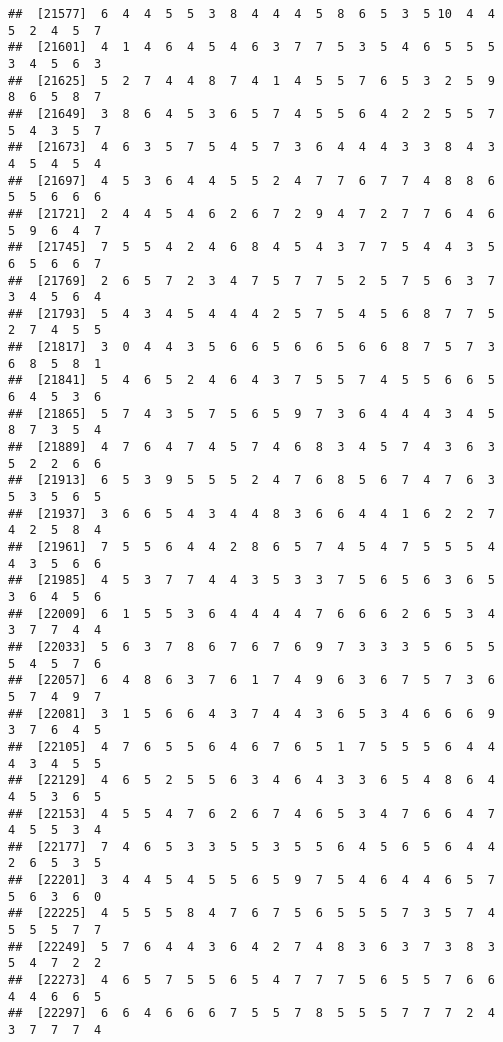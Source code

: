\documentclass[
]{book}
\begin{document}
\begin{verbatim}
##  [21577]  6  4  4  5  5  3  8  4  4  4  5  8  6  5  3  5 10  4  4  5  2  4  5  7
##  [21601]  4  1  4  6  4  5  4  6  3  7  7  5  3  5  4  6  5  5  5  3  4  5  6  3
##  [21625]  5  2  7  4  4  8  7  4  1  4  5  5  7  6  5  3  2  5  9  8  6  5  8  7
##  [21649]  3  8  6  4  5  3  6  5  7  4  5  5  6  4  2  2  5  5  7  5  4  3  5  7
##  [21673]  4  6  3  5  7  5  4  5  7  3  6  4  4  4  3  3  8  4  3  4  5  4  5  4
##  [21697]  4  5  3  6  4  4  5  5  2  4  7  7  6  7  7  4  8  8  6  5  5  6  6  6
##  [21721]  2  4  4  5  4  6  2  6  7  2  9  4  7  2  7  7  6  4  6  5  9  6  4  7
##  [21745]  7  5  5  4  2  4  6  8  4  5  4  3  7  7  5  4  4  3  5  6  5  6  6  7
##  [21769]  2  6  5  7  2  3  4  7  5  7  7  5  2  5  7  5  6  3  7  3  4  5  6  4
##  [21793]  5  4  3  4  5  4  4  4  2  5  7  5  4  5  6  8  7  7  5  2  7  4  5  5
##  [21817]  3  0  4  4  3  5  6  6  5  6  6  5  6  6  8  7  5  7  3  6  8  5  8  1
##  [21841]  5  4  6  5  2  4  6  4  3  7  5  5  7  4  5  5  6  6  5  6  4  5  3  6
##  [21865]  5  7  4  3  5  7  5  6  5  9  7  3  6  4  4  4  3  4  5  8  7  3  5  4
##  [21889]  4  7  6  4  7  4  5  7  4  6  8  3  4  5  7  4  3  6  3  5  2  2  6  6
##  [21913]  6  5  3  9  5  5  5  2  4  7  6  8  5  6  7  4  7  6  3  5  3  5  6  5
##  [21937]  3  6  6  5  4  3  4  4  8  3  6  6  4  4  1  6  2  2  7  4  2  5  8  4
##  [21961]  7  5  5  6  4  4  2  8  6  5  7  4  5  4  7  5  5  5  4  4  3  5  6  6
##  [21985]  4  5  3  7  7  4  4  3  5  3  3  7  5  6  5  6  3  6  5  3  6  4  5  6
##  [22009]  6  1  5  5  3  6  4  4  4  4  7  6  6  6  2  6  5  3  4  3  7  7  4  4
##  [22033]  5  6  3  7  8  6  7  6  7  6  9  7  3  3  3  5  6  5  5  5  4  5  7  6
##  [22057]  6  4  8  6  3  7  6  1  7  4  9  6  3  6  7  5  7  3  6  5  7  4  9  7
##  [22081]  3  1  5  6  6  4  3  7  4  4  3  6  5  3  4  6  6  6  9  3  7  6  4  5
##  [22105]  4  7  6  5  5  6  4  6  7  6  5  1  7  5  5  5  6  4  4  4  3  4  5  5
##  [22129]  4  6  5  2  5  5  6  3  4  6  4  3  3  6  5  4  8  6  4  4  5  3  6  5
##  [22153]  4  5  5  4  7  6  2  6  7  4  6  5  3  4  7  6  6  4  7  4  5  5  3  4
##  [22177]  7  4  6  5  3  3  5  5  3  5  5  6  4  5  6  5  6  4  4  2  6  5  3  5
##  [22201]  3  4  4  5  4  5  5  6  5  9  7  5  4  6  4  4  6  5  7  5  6  3  6  0
##  [22225]  4  5  5  5  8  4  7  6  7  5  6  5  5  5  7  3  5  7  4  5  5  5  7  7
##  [22249]  5  7  6  4  4  3  6  4  2  7  4  8  3  6  3  7  3  8  3  5  4  7  2  2
##  [22273]  4  6  5  7  5  5  6  5  4  7  7  7  5  6  5  5  7  6  6  4  4  6  6  5
##  [22297]  6  6  4  6  6  6  7  5  5  7  8  5  5  5  7  7  7  2  4  3  7  7  7  4

\end{verbatim}
\end{document}
